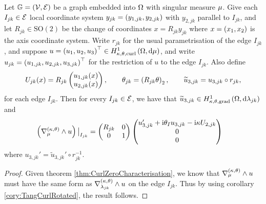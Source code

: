 \begin{theorem} \label{thm:TangCurlGraph}
	Let $\mathbb{G}=\left( \mathcal{V}, \mathcal{E} \right)$ be a graph embedded into $\Omega$ with singular measure $\mu$.
	Give each $I_{jk}\in\mathcal{E}$ local coordinate system $y_{jk}=\left( y_{1, jk},y_{2, jk} \right)$ with $y_{2,jk}$ parallel to $I_{jk}$, and let $R_{jk}\in\mathrm{SO}(2)$ be the change of coordinates $x=R_{jk}y_{jk}$ where $x=\left( x_1, x_2 \right)$ is the axis coordinate system.
	Write $r_{jk}$ for the usual parametrisation of the edge $I_{jk}$, and suppose $u=\left( u_1, u_2, u_3 \right)^\top\in H^1_{\kappa,\theta,\mathrm{curl}}\left( \Omega, \mathrm{d}\mu \right)$, and write $u_{jk}=\left( u_{1,jk}, u_{2,jk}, u_{3,jk} \right)^\top$ for the restriction of $u$ to the edge $I_{jk}$.
	Also define
	\begin{align*}
		U_{jk}(x) = R_{jk}\begin{pmatrix} u_{1, jk}(x) \\ u_{2, jk}(x) \end{pmatrix},
		\qquad \theta_{jk} = \left(  R_{jk}\theta  \right)_2,
		\qquad \widetilde{u}_{3,jk} = u_{3,jk} \circ r_{jk},
	\end{align*}
	for each edge $I_{jk}$.
	Then for every $I_{jk}\in\mathcal{E}$, we have that $\widetilde{u}_{3,jk}\in H^1_{\kappa,\theta,\mathrm{grad}}\left( \Omega, \mathrm{d}\lambda_{jk} \right)$ and
	\begin{align*}
		\left(  \nabla_{\mu}^{\left( \kappa, \theta \right)}\wedge u  \right)\big\vert_{I_{jk}} &= 
		\begin{pmatrix} R_{jk} & 0 \\ 0 & 1 \end{pmatrix}
		\begin{pmatrix} u_{3,jk}' + \mathrm{i}\theta_I u_{3,jk} - \mathrm{i}\kappa U_{2,jk} \\ 0 \\ 0 \end{pmatrix}
	\end{align*}
	where $u_{3,jk}' = \widetilde{u}_{3,jk}' \circ r_{jk}^{-1}$.
\end{theorem}
\begin{proof}
	Given theorem \ref{thm:CurlZeroCharacterisation}, we know that $\nabla_{\mu}^{\left( \kappa, \theta \right)}\wedge u$ must have the same form as $\nabla_{\lambda_{jk}}^{\left( \kappa, \theta \right)}\wedge u$ on the edge $I_{jk}$.
	Thus by using corollary \ref{cory:TangCurlRotated}, the result follows.
\end{proof}


